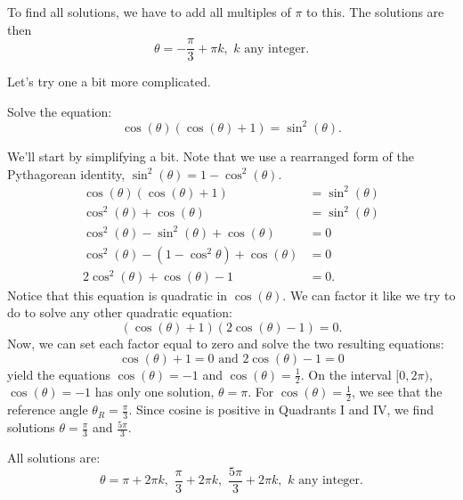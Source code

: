 \documentclass[nooutcomes]{ximera}
\begin{document}
\begin{example}
\begin{explanation}
		To find all solutions, we have to add all multiples of $\pi$ to this.  
		The solutions are then $$ \theta = -\frac{\pi}{3}+ \pi k , \,\, k \textrm{ any integer}. $$
				
	\end{explanation}
\end{example}

Let's try one a bit more complicated.
\begin{example}
	Solve the equation: \[ \cos(\theta) \left( \cos(\theta) + 1\right) = \sin^2(\theta). \]
	\begin{explanation}
		We'll start by simplifying a bit. Note that we use a rearranged form of the Pythagorean identity, $\sin^2(\theta)  = 1 - \cos^2(\theta)$. 
		\begin{align*}
			\cos(\theta) \left( \cos(\theta) + 1\right) &= \sin^2(\theta) \\
			\cos^2(\theta) + \cos(\theta) &= \sin^2(\theta) \\
			\cos^2(\theta) - \sin^2(\theta) + \cos(\theta) &= 0\\
			\cos^2(\theta) - \left(1-\cos^2\theta\right) + \cos(\theta) &= 0\\
			2\cos^2(\theta) + \cos(\theta) - 1 &= 0.
		\end{align*}
		Notice that this equation is quadratic in $\cos(\theta)$.  We can factor it like we try to do to solve any other quadratic equation:
		\[ \left( \cos(\theta) + 1 \right) \left( 2 \cos(\theta) - 1\right) = 0.\]
		Now, we can set each factor equal to zero and solve the two resulting equations:
		$$\cos(\theta) + 1 = 0 \text{ and } 2\cos(\theta) - 1 = 0$$
		yield the equations $\cos(\theta) = -1$ and $\cos(\theta) = \frac{1}{2}$. 
		On the interval $[0, 2\pi)$, $\cos(\theta) = -1$ has only one solution, $\theta = {\pi}$.  
		For $\cos(\theta) = \frac{1}{2}$, we see that the reference angle $\theta_R = {\frac{\pi}{3}}$.  Since cosine is positive in Quadrants I and IV,
		we find solutions $\theta = \frac{\pi}{3}$ and $\frac{5\pi}{3}$.
		
		All solutions are:
		\[ \theta = \pi + 2 \pi k, \,\, \frac{\pi}{3}+ 2 \pi k ,\,\, \frac{5\pi}{3} + 2\pi k, \,\, k \textrm{ any integer.} \]
	\end{explanation}
\end{example}
\end{document}
